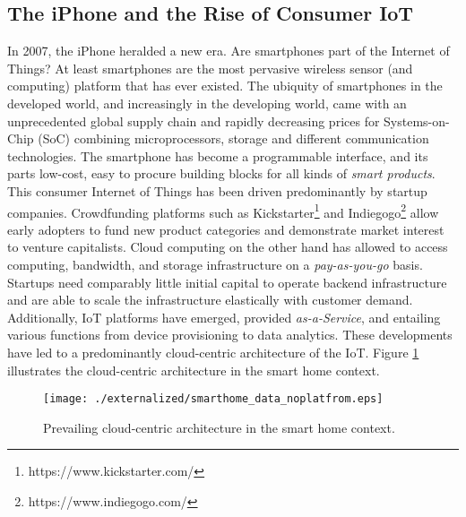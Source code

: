 \subsection{The iPhone and the Rise of Consumer IoT}

In 2007, the iPhone heralded a new era. Are smartphones part of the Internet of Things? At least smartphones are the most pervasive wireless sensor (and computing) platform that has ever existed. The ubiquity of smartphones in the developed world, and increasingly in the developing world, came with an unprecedented global supply chain and rapidly decreasing prices for Systems-on-Chip (SoC) combining microprocessors, storage and different communication technologies. The smartphone has become a programmable interface, and its parts low-cost, easy to procure building blocks for all kinds of \emph{smart products}. This consumer Internet of Things has been driven predominantly by startup companies. Crowdfunding platforms such as Kickstarter\footnote{https://www.kickstarter.com/} and Indiegogo\footnote{https://www.indiegogo.com/} allow early adopters to fund new product categories and demonstrate market interest to venture capitalists. Cloud computing on the other hand has allowed to access computing, bandwidth, and storage infrastructure on a \emph{pay-as-you-go} basis. Startups need comparably little initial capital to operate backend infrastructure and are able to scale the infrastructure elastically with customer demand. Additionally, IoT platforms have emerged, provided \emph{as-a-Service}, and entailing various functions from device provisioning to data analytics. These developments have led to a predominantly cloud-centric architecture of the IoT. Figure \ref{fig:smarthome} illustrates the cloud-centric architecture in the smart home context.


\begin{figure}
\centering
\texttt{[image: ./externalized/smarthome\_data\_noplatfrom.eps]}
\caption{Prevailing cloud-centric architecture in the smart home context.}
\label{fig:smarthome}
\end{figure}




